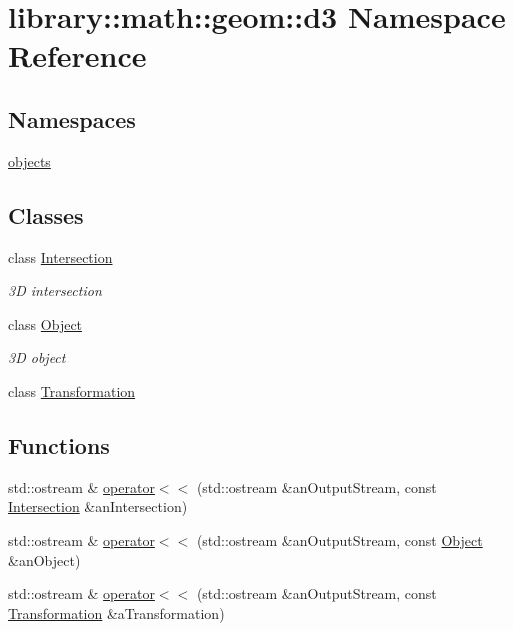 \hypertarget{namespacelibrary_1_1math_1_1geom_1_1d3}{}\section{library\+:\+:math\+:\+:geom\+:\+:d3 Namespace Reference}
\label{namespacelibrary_1_1math_1_1geom_1_1d3}
\subsection*{Namespaces}
\begin{DoxyCompactItemize}
\item 
 \hyperlink{namespacelibrary_1_1math_1_1geom_1_1d3_1_1objects}{objects}
\end{DoxyCompactItemize}
\subsection*{Classes}
\begin{DoxyCompactItemize}
\item 
class \hyperlink{classlibrary_1_1math_1_1geom_1_1d3_1_1_intersection}{Intersection}
\begin{DoxyCompactList}\small\item\em 3D intersection \end{DoxyCompactList}\item 
class \hyperlink{classlibrary_1_1math_1_1geom_1_1d3_1_1_object}{Object}
\begin{DoxyCompactList}\small\item\em 3D object \end{DoxyCompactList}\item 
class \hyperlink{classlibrary_1_1math_1_1geom_1_1d3_1_1_transformation}{Transformation}
\end{DoxyCompactItemize}
\subsection*{Functions}
\begin{DoxyCompactItemize}
\item 
std\+::ostream \& \hyperlink{namespacelibrary_1_1math_1_1geom_1_1d3_a2fc45a2b6634333d36628dfc09b99cdb}{operator$<$$<$} (std\+::ostream \&an\+Output\+Stream, const \hyperlink{classlibrary_1_1math_1_1geom_1_1d3_1_1_intersection}{Intersection} \&an\+Intersection)
\item 
std\+::ostream \& \hyperlink{namespacelibrary_1_1math_1_1geom_1_1d3_a891f0a129431fdafb0b5a70c32ec181e}{operator$<$$<$} (std\+::ostream \&an\+Output\+Stream, const \hyperlink{classlibrary_1_1math_1_1geom_1_1d3_1_1_object}{Object} \&an\+Object)
\item 
std\+::ostream \& \hyperlink{namespacelibrary_1_1math_1_1geom_1_1d3_af14c56626509ee3737275cc3badb6bc0}{operator$<$$<$} (std\+::ostream \&an\+Output\+Stream, const \hyperlink{classlibrary_1_1math_1_1geom_1_1d3_1_1_transformation}{Transformation} \&a\+Transformation)
\end{DoxyCompactItemize}


